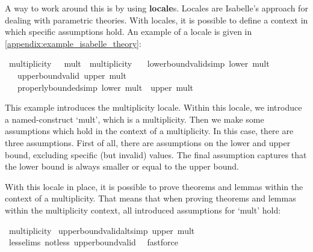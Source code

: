 A way to work around this is by using \textbf{locale}s. Locales are Isabelle's approach for dealing with parametric theories. With locales, it is possible to define a context in which specific assumptions hold. An example of a locale is given in \cref{appendix:example_isabelle_theory}:
\vspace{1em}\begin{isabellebody}
\isamarkupfalse%
\ multiplicity\ {\isacharequal}\ \ mult\ {\isacharcolon}{\isacharcolon}\ {\isachardoublequoteopen}multiplicity{\isachardoublequoteclose}\isanewline
\ \ \ lower{\isacharunderscore}bound{\isacharunderscore}valid{\isacharbrackleft}simp{\isacharbrackright}{\isacharcolon}\ {\isachardoublequoteopen}lower\ mult\ {\isasymnoteq}\ \isactrlemph {\isachardoublequoteclose}\isanewline
\ \ \ upper{\isacharunderscore}bound{\isacharunderscore}valid{\isacharcolon}\ {\isachardoublequoteopen}upper\ mult\ {\isasymnoteq}\ \isanewline
\ \ \ properly{\isacharunderscore}bounded{\isacharbrackleft}simp{\isacharbrackright}{\isacharcolon}\ {\isachardoublequoteopen}lower\ mult\ {\isasymle}\ upper\ mult{\isachardoublequoteclose}
\end{isabellebody}

This example introduces the multiplicity locale. Within this locale, we introduce a named-construct `mult', which is a multiplicity. Then we make some assumptions which hold in the context of a multiplicity. In this case,  there are three assumptions. First of all, there are assumptions on the lower and upper bound, excluding specific (but invalid) values. The final assumption captures that the lower bound is always smaller or equal to the upper bound.

With this locale in place, it is possible to prove theorems and lemmas within the context of a multiplicity. That means that when proving theorems and lemmas within the multiplicity context, all introduced assumptions for `mult' hold:
\vspace{1em}\begin{isabellebody}
\isamarkupfalse%
\ multiplicity\isanewline
{}\isanewline
\isanewline
{}\isamarkupfalse%
\ upper{\isacharunderscore}bound{\isacharunderscore}valid{\isacharunderscore}alt{\isacharbrackleft}simp{\isacharbrackright}{\isacharcolon}\ {\isachardoublequoteopen}upper\ mult\ {\isasymge}\ \isanewline
%
\isadelimproof
\ \ %
\endisadelimproof
%
\isatagproof
{}\isamarkupfalse%
\ less{\isacharunderscore}{\isasymM}{\isachardot}elims\ not{\isacharunderscore}less\ upper{\isacharunderscore}bound{\isacharunderscore}valid\ \isamarkupfalse%
\ fastforce%
\endisatagproof
{\isafoldproof}%
%
\isadelimproof
\isanewline
%
\endisadelimproof
\isanewline
{}\isamarkupfalse%
\end{isabellebody}

